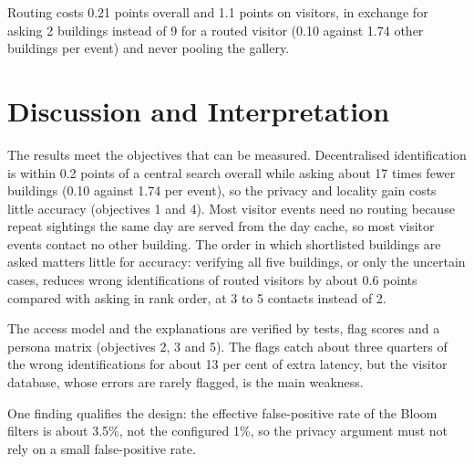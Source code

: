 \documentclass[12pt,a4paper,oneside]{report}
\begin{document}
Routing costs 0.21 points overall and 1.1 points on visitors, in exchange for asking 2 buildings instead of 9 for a routed visitor (0.10 against 1.74 other buildings per event) and never pooling the gallery.

\section{Discussion and Interpretation}
The results meet the objectives that can be measured. Decentralised identification is within 0.2 points of a central search overall while asking about 17 times fewer buildings (0.10 against 1.74 per event), so the privacy and locality gain costs little accuracy (objectives 1 and 4). Most visitor events need no routing because repeat sightings the same day are served from the day cache, so most visitor events contact no other building. The order in which shortlisted buildings are asked matters little for accuracy: verifying all five buildings, or only the uncertain cases, reduces wrong identifications of routed visitors by about 0.6 points compared with asking in rank order, at 3 to 5 contacts instead of 2.

The access model and the explanations are verified by tests, flag scores and a persona matrix (objectives 2, 3 and 5). The flags catch about three quarters of the wrong identifications for about 13 per cent of extra latency, but the visitor database, whose errors are rarely flagged, is the main weakness.

One finding qualifies the design: the effective false-positive rate of the Bloom filters is about 3.5\%, not the configured 1\%, so the privacy argument must not rely on a small false-positive rate.
\end{document}
